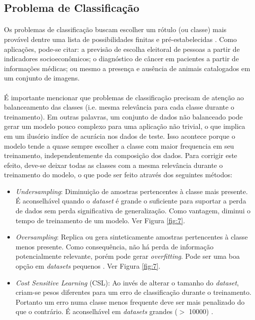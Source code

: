 \subsection{Problema de Classificação}

\paragraph{} Os problemas de classificação buscam escolher um rótulo (ou classe) mais provável dentre uma lista de possibilidades finitas e pré-estabelecidas \cite{muller2016introduction}. Como aplicações, pode-se citar: a previsão de escolha eleitoral de pessoas a partir de indicadores socioeconômicos; o diagnóstico de câncer em pacientes a partir de informações médicas; ou mesmo a presença e ausência de animais catalogados em um conjunto de imagens.

\paragraph{} É importante mencionar que problemas de classificação precisam de atenção ao balanceamento das classes (i.e. mesma relevância para cada classe durante o treinamento). Em outras palavras, um conjunto de dados não balanceado pode gerar um modelo pouco complexo para uma aplicação não trivial, o que implica em um ilusório indíce de acurácia nos dados de teste. Isso acontece porque o modelo tende a quase sempre escolher a classe com maior frequencia em seu treinamento, independentemente da composição dos dados. Para corrigir este efeito, deve-se deixar todas as classes com a mesma relevância durante o treinamento do modelo, o que pode ser feito através dos seguintes métodos:

\begin{itemize}
    \item \textit{Undersampling}: Diminuição de amostras pertencentes à classe mais presente. É aconselhável quando o \textit{dataset} é grande o suficiente para suportar a perda de dados sem perda significativa de generalização. Como vantagem, diminui o tempo de treinamento de um modelo. Ver Figura \ref{fig:7}.
    \item \textit{Oversampling}: Replica ou gera sinteticamente amostras pertencentes à classe menos presente. Como consequência, não há perda de informação potencialmente relevante, porém pode gerar \textit{overfitting}. Pode ser uma boa opção em \textit{datasets} pequenos \cite{weiss2007cost}. Ver Figura \ref{fig:7}.
    \item \textit{Cost Sensitive Learning} (CSL): Ao invés de alterar o tamanho do \textit{dataset}, criam-se pesos diferentes para um erro de classificação durante o treinamento. Portanto um erro numa classe menos frequente deve ser mais penalizado do que o contrário. É aconselhável em \textit{datasets} grandes ($>$ 10000) \cite{weiss2007cost}.
\end{itemize}

